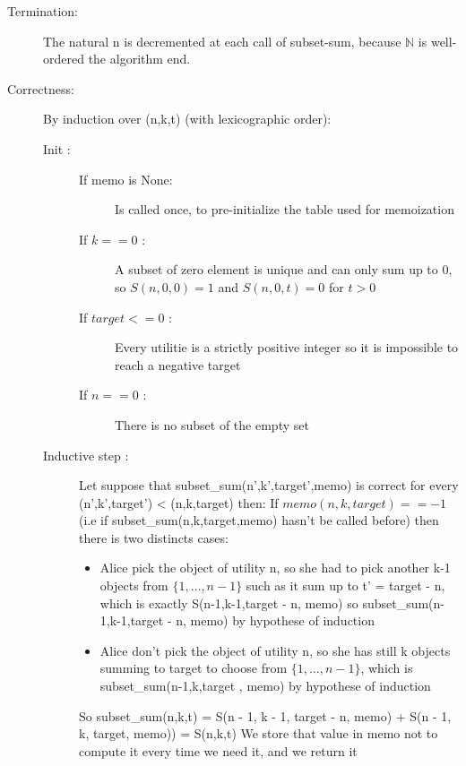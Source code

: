 \documentclass[a4paper, english, 10pt]{article}
\begin{document}
\begin{description}
	\item[Termination:] The natural n is decremented at each call of subset-sum, because $\mathbb{N}$ is well-ordered the algorithm end.
	\item[Correctness:] By induction over (n,k,t) (with lexicographic order):
	
	
		\begin{description}
			\item[Init :]
			\begin{description}
			\item[If memo is None:] Is called once, to pre-initialize the table used for memoization
			\item[If $k==0$ :] A subset of zero element is unique and can only sum up to 0, so $S(n,0,0) = 1$ and $S(n,0,t) = 0$ for $t > 0$ 
			\item[If $target <= 0$ :] Every utilitie is a strictly positive integer so it is impossible to reach a negative target
			\item[If $n==0$ :] There is no subset of the empty set
			\end{description}
			\item[Inductive step :] Let suppose that subset\_sum(n',k',target',memo) is correct for every (n',k',target') < (n,k,target) then:
			 If $ memo(n,k,target) == -1 $ (i.e if subset\_sum(n,k,target,memo) hasn't be called before) then there is two distincts cases:
			  \begin{itemize}
			  	\item Alice pick the object of utility n, so she had to pick another k-1 objects from $\{1, \dots, n-1\}$ such as it sum up to t' = target - n, which is exactly S(n-1,k-1,target - n, memo) so subset\_sum(n-1,k-1,target - n, memo) by hypothese of induction
			  	\item Alice don't pick the object of utility n, so she has still k objects summing to target to choose from $\{1, \dots, n-1\}$, which is subset\_sum(n-1,k,target , memo) by hypothese of induction
			  \end{itemize}
		  So subset\_sum(n,k,t) = S(n - 1, k - 1, target - n, memo) + S(n - 1, k, target, memo)) = S(n,k,t)
		  We store that value in memo not to compute it every time we need it, and we return it
		  

			
			
			 
		\end{description}
\end{description} 
\end{document}
